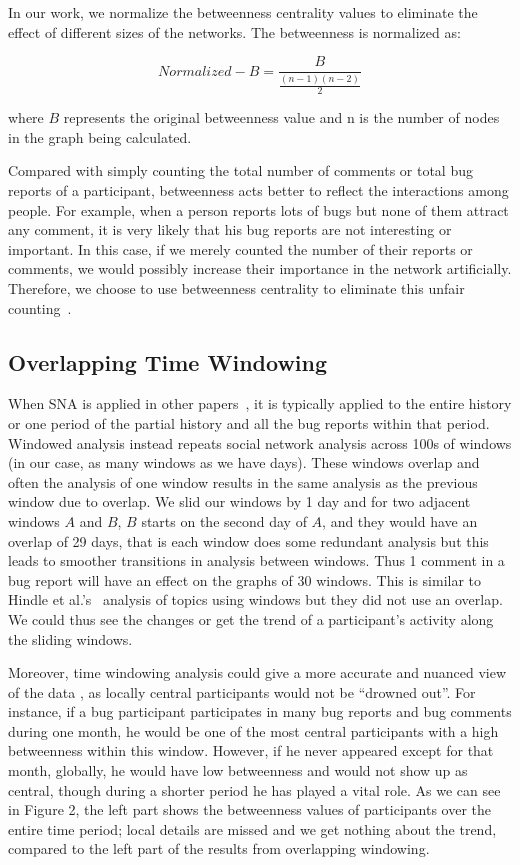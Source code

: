 \documentclass[conference]{IEEEtran}
\begin{document}
In our work, we normalize the betweenness centrality values to eliminate the effect of different sizes of the
networks. The betweenness is normalized as:

\begin{equation}
\label{normalizedb}
Normalized-B = \frac{B}{\frac{(n-1)(n-2)}{2}}
\end{equation} 

where $B$ represents the original betweenness value and n is the number of nodes in the graph being calculated.

Compared with simply counting the total number of comments or total
bug reports of a participant, betweenness acts better to reflect the
interactions among people. For example, when a person reports lots of
bugs but none of them attract any comment, it is very likely that
his bug reports are not interesting or important. In this case, if
we merely counted the number of their reports or comments, we would
possibly increase their importance in the network
artificially. Therefore, we choose to use betweenness centrality to
eliminate this unfair counting~\cite{ICSEsocio:la}.

\subsection{Overlapping Time Windowing}
\label{overlappingtimewindowing}
When SNA is applied in other
papers~\cite{MSR:christ,ICSEsocio:meneely}, it is typically applied to
the entire history or one period of the partial history and all the
bug reports within that period.
Windowed analysis instead repeats social network analysis across 100s
of windows (in our case, as many windows as we have days). These
windows overlap and often the analysis of one window results in the
same analysis as the previous window due to overlap. We slid our
windows by 1 day and for two adjacent windows
$A$ and $B$, $B$ starts on the second day of $A$, and they would have
an overlap of 29 days, that is each window does
some redundant analysis but this leads to smoother transitions in
analysis between windows. Thus 1 comment in a bug report will have an
effect on the graphs of 30 windows. This is similar to Hindle et
al.'s~\cite{ICSMwindowed:hindle} analysis of topics using windows but
they did not use an overlap. We could thus see the changes or get the trend of a participant's activity along the sliding windows.

Moreover, time windowing analysis could give a more accurate and
nuanced view of the data \cite{ICSEsocio:meneely}
\cite{ICSMwindowed:hindle}, as locally central participants would not
be ``drowned out''. For instance, if a
bug participant participates in many bug reports and bug comments during one
month, he would be one of the most central participants with a high
betweenness within this window. However, if he never appeared except for that
month, globally, he would have low betweenness and would not show up
as central, though during a shorter period he has played a vital role. 
As we can see in Figure 2, the left part shows the betweenness values of participants 
over the entire time period; local details are missed and we get nothing about the trend, compared to the left part of the results from overlapping windowing.
\end{document}
